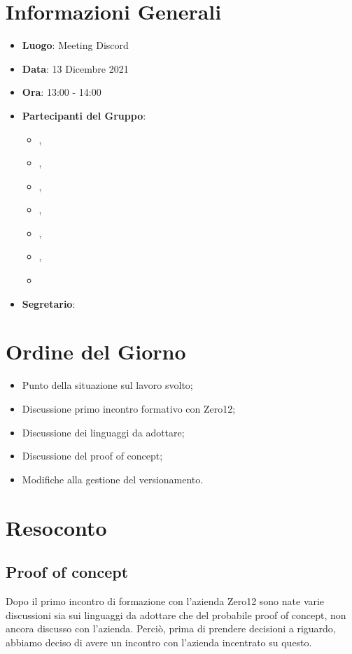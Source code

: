 \section{Informazioni Generali}

\begin{itemize}
\item{\textbf{Luogo}}: Meeting Discord
\item{\textbf{Data}}: 13 Dicembre 2021
\item{\textbf{Ora}}: 13:00 - 14:00
\item{\textbf{Partecipanti del Gruppo}}: 
	\begin{itemize}
	\item{\EP{},} 
	\item{\FP{},}
	\item{\GC{},}
	\item{\LW{},}
	\item{\MB{},}
	\item{\MG{},}
	\item{\PV{}}
	\end{itemize} 
\item{\textbf{Segretario}}: \PV{}	
\end{itemize}

\section{Ordine del Giorno}
\begin{itemize}
\item{Punto della situazione sul lavoro svolto;}
\item{Discussione primo incontro formativo con Zero12;}
\item{Discussione dei linguaggi da adottare;}
\item{Discussione del proof of concept;}
\item{Modifiche alla gestione del versionamento.}
\end{itemize}

\section{Resoconto}

\subsection{Proof of concept}
Dopo il primo incontro di formazione con l'azienda Zero12 sono nate varie discussioni sia sui linguaggi da adottare che del probabile proof of concept, non ancora discusso con l'azienda. Perciò, prima di prendere decisioni a riguardo, abbiamo deciso di avere un incontro con l'azienda incentrato su questo.


